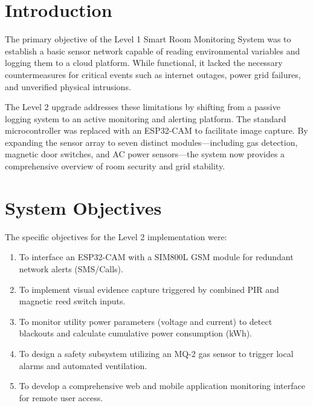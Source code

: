 \documentclass[12pt,a4paper]{article}
\begin{document}
\newpage
\begin{abstract}
This report details the design and implementation of the Level 2 upgrade for the Smart Room Monitoring System. Building upon the baseline parameter logging established in Level 1, this upgrade introduces complex hardware integration for enhanced security, safety, and energy profiling. An ESP32-CAM microcontroller was utilized to capture visual evidence of intrusions, while a SIM800L GSM module was integrated to ensure redundant SMS and call alerts during network outages. Additionally, ZMPT101B and ACS712 sensors were deployed to monitor AC mains voltage and current, enabling blackout detection and power consumption tracking. Data is transmitted to a ThingSpeak web dashboard, and real-time remote control is handled via a mobile application interface (Telegram/Blynk). The resulting prototype successfully met all functional deliverables, operating autonomously to secure and monitor the room environment.
\end{abstract}

\tableofcontents
\newpage

\section{Introduction}
The primary objective of the Level 1 Smart Room Monitoring System was to establish a basic sensor network capable of reading environmental variables and logging them to a cloud platform. While functional, it lacked the necessary countermeasures for critical events such as internet outages, power grid failures, and unverified physical intrusions.

The Level 2 upgrade addresses these limitations by shifting from a passive logging system to an active monitoring and alerting platform. The standard microcontroller was replaced with an ESP32-CAM to facilitate image capture. By expanding the sensor array to seven distinct modules—including gas detection, magnetic door switches, and AC power sensors—the system now provides a comprehensive overview of room security and grid stability.

\section{System Objectives}
The specific objectives for the Level 2 implementation were:
\begin{enumerate}
    \item To interface an ESP32-CAM with a SIM800L GSM module for redundant network alerts (SMS/Calls).
    \item To implement visual evidence capture triggered by combined PIR and magnetic reed switch inputs.
    \item To monitor utility power parameters (voltage and current) to detect blackouts and calculate cumulative power consumption (kWh).
    \item To design a safety subsystem utilizing an MQ-2 gas sensor to trigger local alarms and automated ventilation.
    \item To develop a comprehensive web and mobile application monitoring interface for remote user access.
\end{enumerate}
\end{document}
